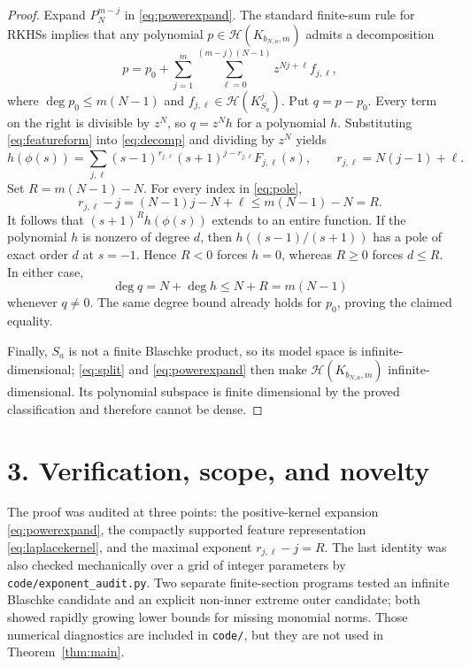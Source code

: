 \documentclass[11pt]{article}
\newcommand{\Hh}{\mathcal H}
\begin{document}
\begin{proof}
Expand $P_N^{m-j}$ in \eqref{eq:powerexpand}.  The standard finite-sum rule
for RKHSs \cite{Aronszajn} implies that any polynomial
$p\in\Hh(K_{b_{N,a},m})$ admits a decomposition
\begin{equation}\label{eq:decomp}
 p=p_0+\sum_{j=1}^m\sum_{\ell=0}^{(m-j)(N-1)}
 z^{Nj+\ell}f_{j,\ell},
\end{equation}
where $\deg p_0\leq m(N-1)$ and
$f_{j,\ell}\in\Hh(K_{S_a}^j)$.  Put $q=p-p_0$.  Every term on the right is
divisible by $z^N$, so $q=z^Nh$ for a polynomial $h$.  Substituting
\eqref{eq:featureform} into \eqref{eq:decomp} and dividing by $z^N$ yields
\begin{equation}\label{eq:pole}
 h(\phi(s))=
 \sum_{j,\ell}(s-1)^{r_{j,\ell}}
 (s+1)^{j-r_{j,\ell}}F_{j,\ell}(s),
 \qquad r_{j,\ell}=N(j-1)+\ell.
\end{equation}
Set $R=m(N-1)-N$.  For every index in \eqref{eq:pole},
\[
 r_{j,\ell}-j=(N-1)j-N+\ell
 \leq m(N-1)-N=R.
\]
It follows that $(s+1)^Rh(\phi(s))$ extends to an entire function.  If the
polynomial $h$ is nonzero of degree $d$, then
$h((s-1)/(s+1))$ has a pole of exact order $d$ at $s=-1$.  Hence $R<0$
forces $h=0$, whereas $R\geq0$ forces $d\leq R$.  In either case,
\[
 \deg q=N+\deg h\leq N+R=m(N-1)
\]
whenever $q\ne0$.  The same degree bound already holds for $p_0$, proving the
claimed equality.

Finally, $S_a$ is not a finite Blaschke product, so its model space is
infinite-dimensional; \eqref{eq:split} and \eqref{eq:powerexpand} then make
$\Hh(K_{b_{N,a},m})$ infinite-dimensional.  Its polynomial subspace is finite
dimensional by the proved classification and therefore cannot be dense.
\end{proof}

\section*{3. Verification, scope, and novelty}

The proof was audited at three points: the positive-kernel expansion
\eqref{eq:powerexpand}, the compactly supported feature representation
\eqref{eq:laplacekernel}, and the maximal exponent
$r_{j,\ell}-j=R$.  The last identity was also checked mechanically over a
grid of integer parameters by \texttt{code/exponent\_audit.py}.  Two separate
finite-section programs tested an infinite Blaschke candidate and an explicit
non-inner extreme outer candidate; both showed rapidly growing lower bounds
for missing monomial norms.  Those numerical diagnostics are included in
\texttt{code/}, but they are not used in Theorem~\ref{thm:main}.
\end{document}
